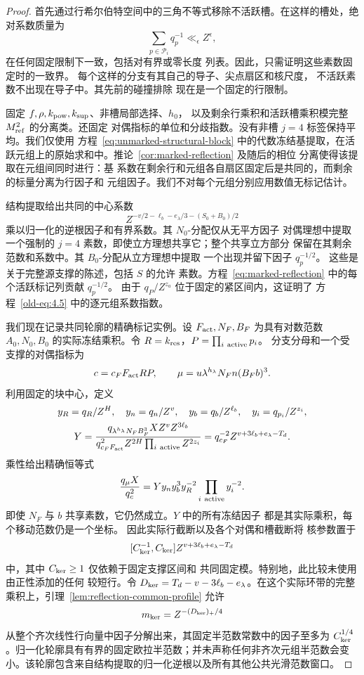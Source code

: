 \documentclass[11pt,a4paper]{article}
\numberwithin{equation}{section}
\numberwithin{figure}{section}
\theoremstyle{definition}
\theoremstyle{remark}
\begin{document}
\begin{proof}
首先通过行希尔伯特空间中的三角不等式移除不活跃槽。在这样的槽处，绝对系数质量为
\[
 \sum_{p\in\mathcal P_i}q_p^{-1}\ll_\epsilon Z^\epsilon,
\]
在任何固定限制下一致，包括对有界或零长度
列表。因此，只需证明这些素数固定时的一致界。
每个这样的分支有其自己的导子、尖点扇区和核尺度，
不活跃素数不出现在导子中。其先前的碰撞排除
现在是一个固定的行限制。

固定 \(f,\rho,k_{\rm pow},k_{\rm sup}\)、非槽局部选择、\(h_0\)，
以及剩余行乘积和活跃槽乘积模完整 \(M_{\rm ref}^2\) 的分离类。还固定
对偶指标的单位和分歧指数。没有非槽 \(j=4\) 标签保持平均。我们仅使用
方程~\eqref{eq:unmarked-structural-block} 中的代数冻结基提取，在活跃元组上的原始求和中。推论~\ref{cor:marked-reflection} 及随后的相位
分离使得该提取在元组间同时进行：基
系数在剩余行和元组各自扇区固定后是共同的，而剩余的标量分离为行因子和
元组因子。我们不对每个元组分别应用数值无标记估计。

结构提取给出共同的中心系数
\[
 Z^{-v/2-\ell_b-e_\lambda/3-(S_0+B_0)/2}
\]
乘以归一化的逆根因子和有界系数。其
\(N_0\)-分配仅从无平方因子
对偶理想中提取一个强制的 \(j=4\) 素数，即使立方理想共享它；整个共享立方部分
保留在其剩余范数和系数中。其 \(B_0\)-分配从立方理想中提取
一个出现并留下因子 \(q_p^{-1/2}\)。
这些是关于完整源支撑的陈述，包括 \(S\) 的允许
素数。方程~\eqref{eq:marked-reflection} 中的每个活跃标记列贡献 \(q_p^{-1/2}\)。
由于 \(q_P/Z^{z_a}\) 位于固定的紧区间内，这证明了
方程~\eqref{old-eq:4.5} 中的逐元组系数指数。

我们现在记录共同轮廓的精确标记实例。设
\(F_{\rm act},N_F,B_F\) 为具有对数范数
\(A_0,N_0,B_0\) 的实际冻结乘积。令 \(R=k_{\rm res}\)，\(P=\prod_{i\ {\rm active}}p_i\)。
分支分母和一个受支撑的对偶指标为
\[
 c=c_FF_{\rm act}RP,\qquad
 \mu=u\lambda^{h_\lambda}N_Fn(B_Fb)^3.
\]
利用固定的块中心，定义
\[
 \begin{gathered}
 y_R=q_R/Z^H,\quad y_n=q_n/Z^v,\quad
 y_b=q_b/Z^{\ell_b},\quad y_i=q_{p_i}/Z^{z_i},\\
 Y=\frac{q_{\lambda^{h_\lambda}N_FB_F^3}X Z^vZ^{3\ell_b}}
          {q_{c_FF_{\rm act}}^2Z^{2H}\prod_{i\ {\rm active}}Z^{2z_i}}
   =q_{c_F}^{-2}Z^{v+3\ell_b+e_\lambda-T_d}.
 \end{gathered}
\]
乘性给出精确恒等式
\begin{equation}\label{eq:reflection-actual-annuli}
 \frac{q_\mu X}{q_c^2}
       =Yy_ny_b^3y_R^{-2}\prod_{i\ {\rm active}}y_i^{-2}.
\end{equation}
即使 \(N_F\) 与 \(b\) 共享素数，它仍然成立。\(Y\) 中的所有冻结因子
都是其实际乘积，每个移动范数仍是一个坐标。
因此实际行截断以及各个对偶和槽截断将
核参数置于
\[
 [C_{\rm ker}^{-1},C_{\rm ker}]
       Z^{v+3\ell_b+e_\lambda-T_d}
\]
中，其中 \(C_{\rm ker}\ge1\) 仅依赖于固定支撑区间和
共同固定模。特别地，此比较未使用由正性添加的任何
较短行。令 \(D_{\rm ker}=T_d-v-3\ell_b-e_\lambda\)。在这个实际环带的完整乘积上，引理~\ref{lem:reflection-common-profile} 允许
\[
 m_{\rm ker}=Z^{-(D_{\rm ker})_+/4}
\]
从整个齐次线性行向量中因子分解出来，其固定半范数常数中的因子至多为 \(C_{\rm ker}^{1/4}\)。归一化轮廓具有有界的固定欧拉半范数；并未声称任何非齐次元组半范数会变小。该轮廓包含来自结构提取的归一化逆根以及所有其他公共光滑范数窗口。


\end{proof}
\end{document}
